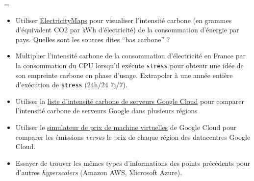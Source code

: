 \documentclass[a4paper,10pt]{article}
\newenvironment{question}
  {\par\begin{mdframed}[linewidth=2pt,linecolor=red]%
    \begin{list}{}{\leftmargin=1cm
                   \labelwidth=\leftmargin}\item[\emoji{red-question-mark}]}
  {\end{list}\end{mdframed}\par}
\newtheorem{question}{Question}
\begin{document}
\begin{question}
    \begin{itemize}
        \item Utiliser \href{https://app.electricitymaps.com/map}{ElectricityMaps}
        pour visualiser l'intensité carbone (en grammes d'équivalent CO2 par kWh
        d'électricité) de la consommation d'énergie par pays. Quelles sont les
        sources dites ``bas carbone'' ?        
        \item Multiplier l'intensité carbone de la consommation d'électricité en
        France par la consommation du CPU lorsqu'il exécute \texttt{stress} pour
        obtenir une idée de son empreinte carbone en phase d'usage. Extrapoler à une
        année entière d'exécution de \texttt{stress} (24h/24 7j/7).
        \item Utiliser la
        \href{https://cloud.google.com/sustainability/region-carbon}{liste
        d'intensité carbone de serveurs Google Cloud} pour comparer l'intensité
        carbone de serveurs Google dans plusieurs régions
        \item Utiliser le
        \href{https://cloud.google.com/products/calculator}{simulateur de prix
        de machine virtuelles} de Google Cloud pour comparer les émissions
        \textit{versus} le prix de chaque région des datacentres Google Cloud.
        \item Essayer de trouver les mêmes types d'informations des points
        précédents pour d'autres \textit{hyperscalers} (Amazon AWS, Microsoft
        Azure).
    \end{itemize}
\end{question}
\end{document}
